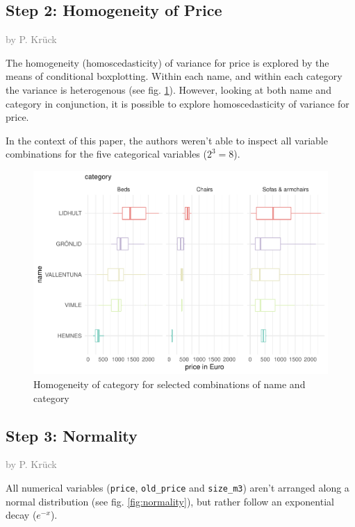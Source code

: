 \documentclass[a4paper, nobind]{templates/ociamthesis}
\begin{document}
\hypertarget{step-2-homogeneity-of-price}{%
\subsection{Step 2: Homogeneity of Price}\label{step-2-homogeneity-of-price}}

\textcolor{gray}{by P. Krück}

The homogeneity (homoscedasticity) of variance for price is explored by the means of conditional boxplotting.
Within each name, and within each category the variance is heterogenous (see fig. \ref{fig:homogeneity}). However, looking at both name and category in conjunction, it is possible to explore homoscedasticity of variance for price.

In the context of this paper, the authors weren't able to inspect all variable combinations for the five categorical variables (\(2^3=8\)).

\begin{figure}
\includegraphics[width=1\linewidth]{_main_files/figure-latex/homogeneity-1} \caption{Homogeneity of category for selected combinations of name and category}\label{fig:homogeneity}
\end{figure}

\hypertarget{step-3-normality}{%
\subsection{Step 3: Normality}\label{step-3-normality}}

\textcolor{gray}{by P. Krück}

All numerical variables (\texttt{price}, \texttt{old\_price} and \texttt{size\_m3}) aren't arranged along a normal distribution (see fig. \ref{fig:normality}), but rather follow an exponential decay (\(e^{-x}\)).
\end{document}
